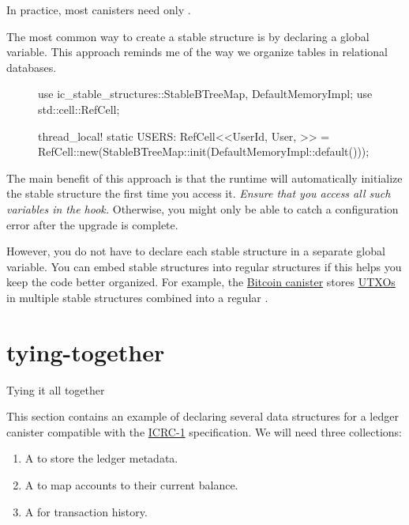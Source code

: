 \documentclass{article}
\begin{document}
In practice, most canisters need only .

The most common way to create a stable structure is by declaring a global variable.
This approach reminds me of the way we organize tables in relational databases.

\begin{figure}
\begin{code}[rust]
use ic_stable_structures::{StableBTreeMap, DefaultMemoryImpl};
use std::cell::RefCell;

thread_local! {
  static USERS: RefCell<\href{#stable-btree}{}<UserId, User, \href{#default-memory-impl}{}>> =
    RefCell::new(StableBTreeMap::init(DefaultMemoryImpl::default()));
}
\end{code}
\end{figure}

The main benefit of this approach is that the runtime will automatically initialize the stable structure the first time you access it.
\emph{Ensure that you access all such variables in the  hook.}
Otherwise, you might only be able to catch a configuration error after the upgrade is complete.

However, you do not have to declare each stable structure in a separate global variable.
You can embed stable structures into regular structures if this helps you keep the code better organized.
For example, the \href{https://github.com/dfinity/bitcoin-canister}{Bitcoin canister} stores \href{https://github.com/dfinity/bitcoin-canister/blob/9242d5f9a784ac115c2042fd09705dd9321ff7b7/canister/src/utxo_set/utxos.rs#L51}{UTXOs} in multiple stable structures combined into a regular .

\section{tying-together}{Tying it all together}

This section contains an example of declaring several data structures for a ledger canister compatible with the \href{https://github.com/dfinity/ICRC-1/blob/3c64844bc6219e1d07ce05e27ec636df1e562114/standards/ICRC-1/README.md}{ICRC-1} specification.
We will need three collections:
\begin{enumerate}
  \item
    A \href{#stable-cell}{} to store the ledger metadata.
  \item
    A \href{#stable-btree}{} to map accounts  to their current balance.
  \item A \href{#stable-log}{} for transaction history.
\end{enumerate}
\end{document}
